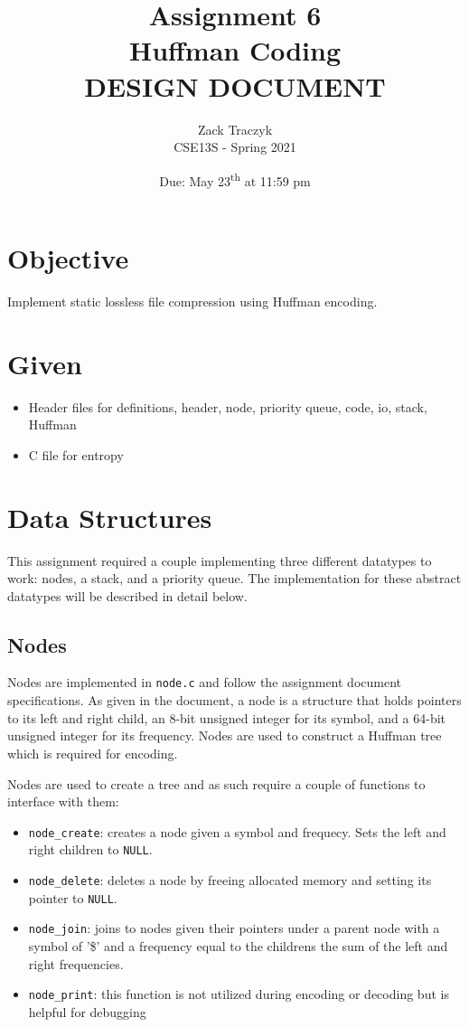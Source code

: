 \documentclass[12pt]{article}
\title{%
	\textbf{Assignment 6 \\ 
		Huffman Coding \\
\large DESIGN DOCUMENT} }
\author{Zack Traczyk \\ CSE13S - Spring 2021}
\date{Due: May 23\textsuperscript{th} at 11:59 pm}
\def\code#1{\texttt{#1}} %
\begin{document}
\maketitle

\section{Objective}

Implement static lossless file compression using Huffman encoding.

\section{Given}

\begin{itemize}
	\item{Header files for definitions, header, node, priority queue, code, io, stack, Huffman}
	\item{C file for entropy}
\end{itemize}


\section{Data Structures}

This assignment required a couple implementing three different datatypes to work:
nodes, a stack, and a priority queue. The implementation for these abstract
datatypes will be described in detail below.

\subsection{Nodes}

Nodes are implemented in \code{node.c} and follow the assignment document specifications.
As given in the document, a node is a structure that holds pointers to its left and 
right child, an 8-bit unsigned integer for its symbol, and a 64-bit unsigned integer 
for its frequency. Nodes are used to construct a Huffman tree which is required for
encoding.

Nodes are used to create a tree and as such require a couple of functions
to interface with them:

\begin{itemize}
	\item{\code{node\_create}: creates a node given a symbol and frequecy. Sets the left and 
		right children to \code{NULL}.}
	\item{\code{node\_delete}: deletes a node by freeing allocated memory and setting its 
		pointer to \code{NULL}.}
	\item{\code{node\_join}: joins to nodes given their pointers under a parent node with a 
			symbol of '\$' and a frequency equal to the childrens the sum of the 
		left and right frequencies.}
	\item{\code{node\_print}: this function is not utilized during encoding or decoding
		but is helpful for debugging}

\end{itemize}
\end{document}
